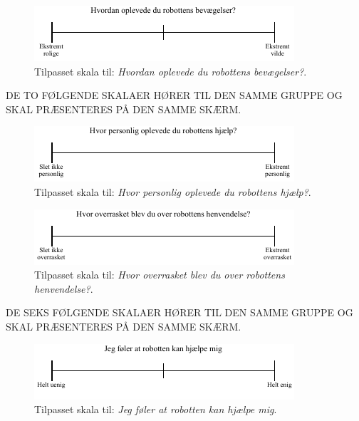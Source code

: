 \noindent
%
%
\begin{figure}[H]
\centering
\includegraphics[width =\textwidth]{Figure/TilpasningAfSkalaer/TilpassetBevaegelserR} 
\caption{Tilpasset skala til: \textit{Hvordan oplevede du robottens bevægelser?}.}
\label{fig:TilpasningBevaegelserR}
\end{figure}
\noindent
%
DE TO FØLGENDE SKALAER HØRER TIL DEN SAMME GRUPPE OG SKAL PRÆSENTERES PÅ DEN SAMME SKÆRM.
%
\begin{figure}[H]
\centering
\includegraphics[width =\textwidth]{Figure/TilpasningAfSkalaer/TilpassetPersonligHjaelp} 
\caption{Tilpasset skala til: \textit{Hvor personlig oplevede du robottens hjælp?}.}
\label{fig:TilpasningPersonligHjaelp}
\end{figure}
\noindent
%
%
\begin{figure}[H]
\centering
\includegraphics[width =\textwidth]{Figure/TilpasningAfSkalaer/TilpassetOverrasketOverR} 
\caption{Tilpasset skala til: \textit{Hvor overrasket blev du over robottens henvendelse?}.}
\label{fig:TilpasningOverrasketOverR}
\end{figure}
\noindent
%   
DE SEKS FØLGENDE SKALAER HØRER TIL DEN SAMME GRUPPE OG SKAL PRÆSENTERES PÅ DEN SAMME SKÆRM.
%
\begin{figure}[H]
\centering
\includegraphics[width =\textwidth]{Figure/TilpasningAfSkalaer/TilpassetRobottenKanHjaelpe} 
\caption{Tilpasset skala til: \textit{Jeg føler at robotten kan hjælpe mig}.}
\label{fig:TilpasningRobottenKanHjaelpe}
\end{figure}
